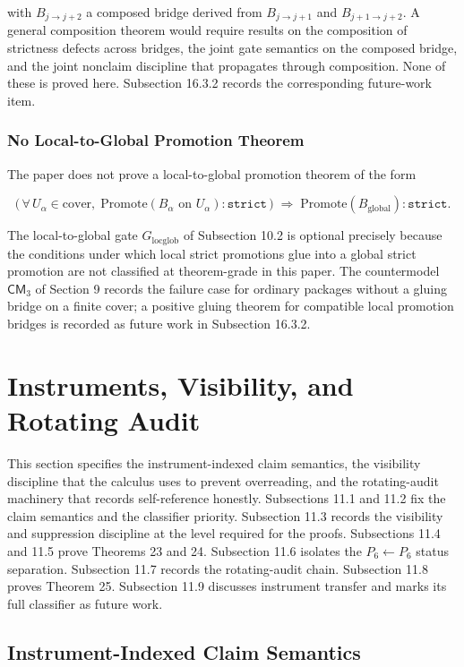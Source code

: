 \documentclass[11pt]{article}
\theoremstyle{definition}
\begin{document}
with \(B_{j\to j+2}\) a composed bridge derived from \(B_{j\to j+1}\) and \(B_{j+1\to j+2}\). A general composition theorem would require results on the composition of strictness defects across bridges, the joint gate semantics on the composed bridge, and the joint nonclaim discipline that propagates through composition. None of these is proved here. Subsection 16.3.2 records the corresponding future-work item.

\subsubsection{No Local-to-Global Promotion Theorem}

The paper does not prove a local-to-global promotion theorem of the form

\[
\bigl(\,\forall\,U_\alpha\in\text{cover},\;\mathrm{Promote}(B_\alpha\text{ on }U_\alpha):\texttt{strict}\,\bigr)\;\Longrightarrow\;\mathrm{Promote}(B_{\mathrm{global}}):\texttt{strict}.
\]

The local-to-global gate \(G_{\mathrm{locglob}}\) of Subsection 10.2 is optional precisely because the conditions under which local strict promotions glue into a global strict promotion are not classified at theorem-grade in this paper. The countermodel \(\mathsf{CM}_3\) of Section 9 records the failure case for ordinary packages without a gluing bridge on a finite cover; a positive gluing theorem for compatible local promotion bridges is recorded as future work in Subsection 16.3.2.
 \section{Instruments, Visibility, and Rotating Audit}

This section specifies the instrument-indexed claim semantics, the visibility discipline that the calculus uses to prevent overreading, and the rotating-audit machinery that records self-reference honestly. Subsections 11.1 and 11.2 fix the claim semantics and the classifier priority. Subsection 11.3 records the visibility and suppression discipline at the level required for the proofs. Subsections 11.4 and 11.5 prove Theorems 23 and 24. Subsection 11.6 isolates the \(P_6\leftarrow P_6\) status separation. Subsection 11.7 records the rotating-audit chain. Subsection 11.8 proves Theorem 25. Subsection 11.9 discusses instrument transfer and marks its full classifier as future work.

\subsection{Instrument-Indexed Claim Semantics}
\end{document}
